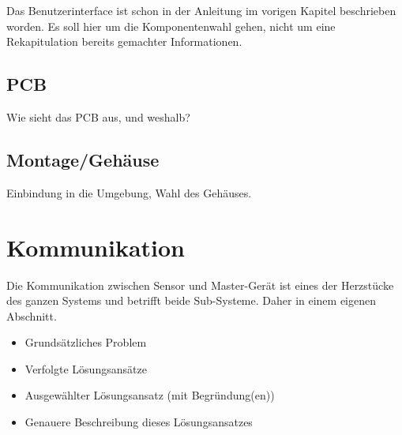 \anweisung Das Benutzerinterface ist schon in der Anleitung im vorigen Kapitel
beschrieben worden. Es soll  hier um die Komponentenwahl gehen,  nicht um eine
Rekapitulation bereits gemachter Informationen.

\subsection{PCB}
\label{subsec:mastergerat:pcb}

Wie sieht das PCB aus, und weshalb?

\subsection{Montage/Geh\"ause}
\label{subsec:mastergerat:pcb}

Einbindung in die Umgebung, Wahl des Geh\"auses.


\section{Kommunikation}
\label{sec:kommunikation}

Die   Kommunikation  zwischen   Sensor  und   Master-Ger\"at  ist   eines  der
Herzst\"ucke des ganzen Systems und betrifft beide Sub-Systeme. Daher in einem
eigenen Abschnitt.

\begin{itemize}
    \item
        Grunds\"atzliches Problem
    \item
        Verfolgte L\"osungsans\"atze
    \item
        Ausgew\"ahlter L\"osungsansatz (mit Begr\"undung(en))
    \item
        Genauere Beschreibung dieses L\"osungsansatzes
\end{itemize}
